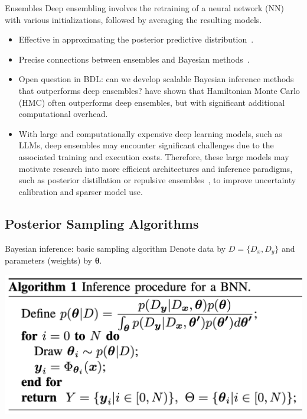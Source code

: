 \documentclass[9pt,handout]{beamer}
\begin{document}
\begin{frame}{Ensembles}
\alert{Deep ensembling} involves the \alert{retraining} of a neural network (NN) with \alert{various initializations}, followed by \alert{averaging} the resulting models. 
\begin{itemize}[<+->]
	\item Effective in approximating the posterior predictive distribution~\citep{wilson2020bayesian}. 
	\item Precise connections between ensembles and Bayesian methods~\citep{ciosek2020conservative, he2020,wild2023a}.
	\item Open question in BDL: can we develop scalable Bayesian inference methods that outperforms deep ensembles? \citet{izmailov2021} have shown that \alert{Hamiltonian Monte Carlo (HMC)} often outperforms deep ensembles, but with significant additional \alert{computational overhead}.
	\item With large and computationally expensive deep learning models, such as LLMs, deep ensembles may encounter significant challenges due to the associated \alert{training and execution costs}. Therefore, these large models may motivate research into more efficient architectures and inference paradigms, such as \alert{posterior distillation} or \alert{repulsive ensembles}~\citep{dangelo2021repulsive}, to improve uncertainty calibration and sparser model use.
\end{itemize}
\end{frame}

\subsection{Posterior Sampling Algorithms}

\begin{frame}{Bayesian inference: basic sampling algorithm}
Denote data by $D=\{D_x,D_y\}$ and parameters (weights) by $\boldsymbol{\theta}$.
\begin{center}
	\includegraphics[width=.8\textwidth]{figures_julyan/bdl/hands-on/algo1}
\end{center}
\end{frame}
\end{document}
